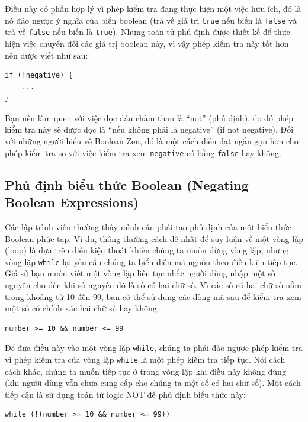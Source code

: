 Điều này có phần hợp lý vì phép kiểm tra đang thực hiện một việc hữu ích, đó là nó đảo ngược ý nghĩa của biến boolean (trả về giá trị \texttt{true} nếu biến là \texttt{false} và trả về \texttt{false} nếu biến là \texttt{true}). Nhưng toán tử phủ định được thiết kế để thực hiện việc chuyển đổi các giá trị boolean này, vì vậy phép kiểm tra này tốt hơn nên được viết như sau:

\begin{verbatim}
if (!negative) {
    ...
}
\end{verbatim}

Bạn nên làm quen với việc đọc dấu chấm than là ``not'' (phủ định), do đó phép kiểm tra này sẽ được đọc là ``nếu không phải là negative'' (if not negative). Đối với những người hiểu về Boolean Zen, đó là một cách diễn đạt ngắn gọn hơn cho phép kiểm tra so với việc kiểm tra xem \texttt{negative} có bằng \texttt{false} hay không.

\subsection*{Phủ định biểu thức Boolean (Negating Boolean Expressions)}

Các lập trình viên thường thấy mình cần phải tạo phủ định của một biểu thức Boolean phức tạp. Ví dụ, thông thường cách dễ nhất để suy luận về một vòng lặp (loop) là dựa trên điều kiện thoát khiến chúng ta muốn dừng vòng lặp, nhưng vòng lặp \texttt{while} lại yêu cầu chúng ta biểu diễn mã nguồn theo điều kiện tiếp tục. Giả sử bạn muốn viết một vòng lặp liên tục nhắc người dùng nhập một số nguyên cho đến khi số nguyên đó là số có hai chữ số. Vì các số có hai chữ số nằm trong khoảng từ 10 đến 99, bạn có thể sử dụng các dòng mã sau để kiểm tra xem một số có chính xác hai chữ số hay không:

\begin{verbatim}
number >= 10 && number <= 99
\end{verbatim}

Để đưa điều này vào một vòng lặp \texttt{while}, chúng ta phải đảo ngược phép kiểm tra vì phép kiểm tra của vòng lặp \texttt{while} là một phép kiểm tra tiếp tục. Nói cách cách khác, chúng ta muốn tiếp tục ở trong vòng lặp khi điều này không đúng (khi người dùng vẫn chưa cung cấp cho chúng ta một số có hai chữ số). Một cách tiếp cận là sử dụng toán tử logic NOT để phủ định biểu thức này:

\begin{verbatim}
while (!(number >= 10 && number <= 99))
\end{verbatim}


